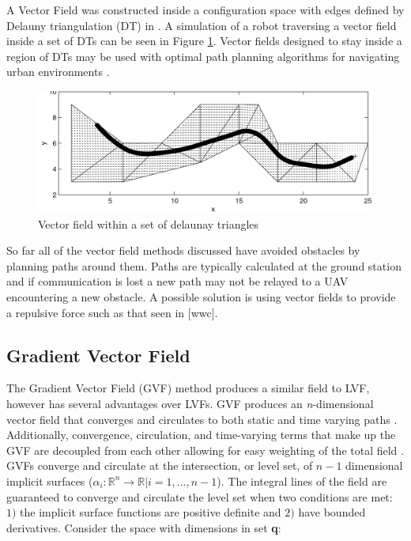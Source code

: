 \documentclass[numbered,pdftex]{ohio-etd}
\begin{document}
A Vector Field was constructed inside a configuration space with edges defined by Delauny triangulation (DT) in \cite{pimenta_fully_2007}.  A simulation of a robot traversing a vector field inside a set of DTs can be seen in Figure \ref{fig:cdtVF}. Vector fields designed to stay inside a region of DTs may be used with optimal path planning algorithms for navigating urban environments \cite{md_simplex_2017}.


\begin{figure}
	\centering
	\includegraphics[width=15cm]{PaperFigures/cdtVF}
	\caption{Vector field within a set of delaunay triangles \cite{pimenta_fully_2007}}
	\label{fig:cdtVF}
\end{figure}

So far all of the vector field methods discussed have avoided obstacles by planning paths around them. Paths are typically calculated at the ground station and if communication is lost a new path may not be relayed to a UAV encountering a new obstacle. A possible solution is using vector fields to provide a repulsive force such as that seen in \cite{panagou_motion_2014,zhou_vector_2014} [wwc]. 

\subsection{Gradient Vector Field}
The Gradient Vector Field (GVF) method produces a similar field to LVF, however has several advantages over LVFs. GVF produces an \textit{n}-dimensional vector field that converges and circulates to both static and time varying paths \cite{goncalves_artificial_2009}. Additionally, convergence, circulation, and time-varying terms that make up the GVF are decoupled from each other allowing for easy weighting of the total field \cite{goncalves_circulation_2010}. GVFs converge and circulate at the intersection, or level set, of $n-1$ dimensional implicit surfaces ($\alpha_i:\mathbb{R}^n\rightarrow\mathbb{R} | i=1,...,n-1$). The integral lines of the field are guaranteed to converge and circulate the level set when two conditions are met: $1)$ the implicit surface functions are positive definite and $2)$ have bounded derivatives. Consider the space with dimensions in set \textbf{q}:
\end{document}
